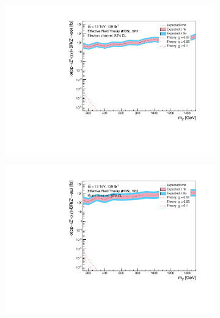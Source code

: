 \documentclass[12pt, a4paper]{book}
\begin{document}
\begin{figure}[!ht]
	\centering
	\begin{subfigure}[b]{0.49\textwidth}
      \centering
      \includegraphics[width=1\textwidth]{Limits/Model_independent/50-100/EFT_HDS/mass_exclusion_ee.pdf}
   \end{subfigure}
   \hfill
   \begin{subfigure}[b]{0.49\textwidth}
      \centering
      \includegraphics[width=1\textwidth]{Limits/Model_independent/50-100/EFT_HDS/mass_exclusion_uu.pdf}
   \end{subfigure}
   \hfill
   \begin{subfigure}[b]{0.49\textwidth}
      \centering

\end{subfigure}
\end{figure}
\end{document}
